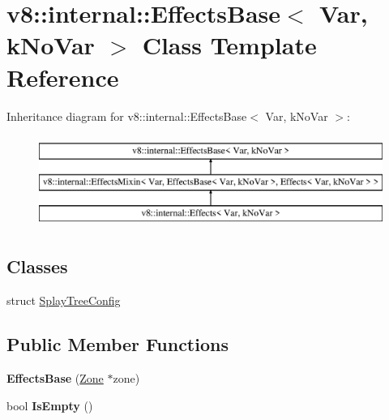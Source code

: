 \hypertarget{classv8_1_1internal_1_1_effects_base}{}\section{v8\+:\+:internal\+:\+:Effects\+Base$<$ Var, k\+No\+Var $>$ Class Template Reference}
\label{classv8_1_1internal_1_1_effects_base}
Inheritance diagram for v8\+:\+:internal\+:\+:Effects\+Base$<$ Var, k\+No\+Var $>$\+:\begin{figure}[H]
\begin{center}
\leavevmode
\includegraphics[height=3.000000cm]{classv8_1_1internal_1_1_effects_base}
\end{center}
\end{figure}
\subsection*{Classes}
\begin{DoxyCompactItemize}
\item 
struct \hyperlink{structv8_1_1internal_1_1_effects_base_1_1_splay_tree_config}{Splay\+Tree\+Config}
\end{DoxyCompactItemize}
\subsection*{Public Member Functions}
\begin{DoxyCompactItemize}
\item 
{\bfseries Effects\+Base} (\hyperlink{classv8_1_1internal_1_1_zone}{Zone} $\ast$zone)\hypertarget{classv8_1_1internal_1_1_effects_base_ac3781c83b3530c7b4d44fe9a55e6c915}{}\label{classv8_1_1internal_1_1_effects_base_ac3781c83b3530c7b4d44fe9a55e6c915}

\item 
bool {\bfseries Is\+Empty} ()\hypertarget{classv8_1_1internal_1_1_effects_base_a3b07d4248fa729245d591aa40df3eee7}{}\label{classv8_1_1internal_1_1_effects_base_a3b07d4248fa729245d591aa40df3eee7}

\end{DoxyCompactItemize}
